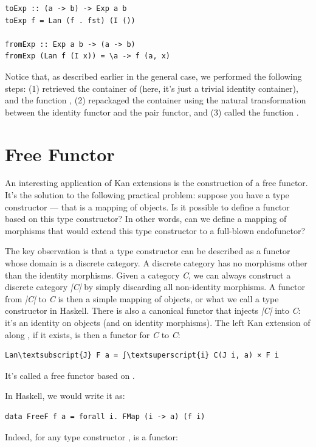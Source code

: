 \begin{Verbatim}
toExp :: (a -> b) -> Exp a b
toExp f = Lan (f . fst) (I ())

fromExp :: Exp a b -> (a -> b)
fromExp (Lan f (I x)) = \a -> f (a, x)
\end{Verbatim}
Notice that, as described earlier in the general case, we performed the
following steps: (1) retrieved the container of  (here, it's
just a trivial identity container), and the function , (2)
repackaged the container using the natural transformation between the
identity functor and the pair functor, and (3) called the function
.

\section{Free Functor}\label{free-functor}

An interesting application of Kan extensions is the construction of a
free functor. It's the solution to the following practical problem:
suppose you have a type constructor --- that is a mapping of objects. Is
it possible to define a functor based on this type constructor? In other
words, can we define a mapping of morphisms that would extend this type
constructor to a full-blown endofunctor?

The key observation is that a type constructor can be described as a
functor whose domain is a discrete category. A discrete category has no
morphisms other than the identity morphisms. Given a category \emph{C},
we can always construct a discrete category \emph{|C|}
by simply discarding all non-identity morphisms. A functor 
from \emph{|C|} to \emph{C} is then a simple mapping
of objects, or what we call a type constructor in Haskell. There is also
a canonical functor  that injects \emph{|C|}
into \emph{C}: it's an identity on objects (and on identity morphisms).
The left Kan extension of  along , if it exists, is
then a functor for \emph{C} to \emph{C}:

\begin{Verbatim}[commandchars=\\\{\}]
Lan\textsubscript{J} F a = ∫\textsuperscript{i} C(J i, a) × F i
\end{Verbatim}
It's called a free functor based on .

In Haskell, we would write it as:

\begin{Verbatim}[commandchars=\\\{\}]
data FreeF f a = forall i. FMap (i -> a) (f i)
\end{Verbatim}
Indeed, for any type constructor ,  is a
functor:

